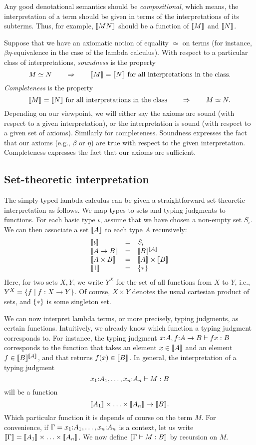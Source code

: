 \documentclass{article}
\begin{document}
Any good denotational semantics should be {\em compositional}, which
means, the interpretation of a term should be given in terms of the
interpretations of its subterms. Thus, for example, $[\![MN]\!]_{}$
should be a function of $[\![M]\!]_{}$ and $[\![N]\!]_{}$. 

Suppose that we have an axiomatic notion of equality $\simeq$ on terms
(for instance, $\beta\eta$-equivalence in the case of the lambda
calculus). With respect to a particular class of interpretations, {\em
  soundness} is the property
\[      M\simeq N \hspace{2em}\Rightarrow\hspace{2em} [\![M]\!]_{}=[\![N]\!]_{} \mbox{ for all
  interpretations in the class}.
\]
{\em Completeness} is the property
\[      [\![M]\!]_{}=[\![N]\!]_{} \mbox{ for all
  interpretations in the class} \hspace{2em}\Rightarrow\hspace{2em} M\simeq N.
\]
Depending on our viewpoint, we will either say the axioms are sound
(with respect to a given interpretation), or the interpretation is
sound (with respect to a given set of axioms). Similarly for
completeness. Soundness expresses the fact that our axioms (e.g.,
$\beta$ or $\eta$) are true with respect to the given interpretation. 
Completeness expresses the fact that our axioms are sufficient.

\subsection{Set-theoretic interpretation}

The simply-typed lambda calculus can be given a straightforward
set-theoretic interpretation as follows. We map types to sets and
typing judgments to functions. For each basic type $\iota$, assume
that we have chosen a non-empty set $S_{\iota}$. We can then associate
a set $[\![A]\!]_{}$ to each type $A$ recursively:
\[ \begin{array}{lll}
  \semm{\iota} &=& S_{\iota} \\
  \semm{A\to B} &=& \semm{B}^{\semm{A}} \\
  \semm{A\times B} &=& \semm{A}\times\semm{B} \\
  \semm{1} &=& \s{*}
\end{array}
\]
Here, for two sets $X,Y$, we write $Y^X$ for the set of all functions
from $X$ to $Y$, i.e., $Y^X=\{f\mid f:X\to Y\}$. Of course, $X\times
Y$ denotes the usual cartesian product of sets, and $\{*\}$ is some
singleton set. 

We can now interpret lambda terms, or more precisely, typing
judgments, as certain functions. Intuitively, we already know which
function a typing judgment corresponds to. For instance, the typing
judgment $x{:}A,f{:}A\to B\vdash fx:B$ corresponds to the
function that takes an element $x\in[\![A]\!]_{}$ and an element
$f\in[\![B]\!]_{}^{[\![A]\!]_{}}$, and that returns $f(x)\in[\![B]\!]_{}$. In
general, the interpretation of a typing judgment
\[     x_1{:}A_1,\ldots,x_n{:}A_n \vdash M:B
\]
will be a function
\[     [\![A_1]\!]_{}\times\ldots\times[\![A_n]\!]_{} \to [\![B]\!]_{}.
\]
Which particular function it is depends of course on the term $M$. 
For convenience, if $\Gamma=x_1{:}A_1,\ldots,x_n{:}A_n$ is a
context, let us write $[\![\Gamma]\!]_{}=[\![A_1]\!]_{}\times\ldots\times[\![A_n]\!]_{}$. 
We now define $[\![\Gamma\vdash M:B]\!]_{}$ by recursion on $M$.
\end{document}
